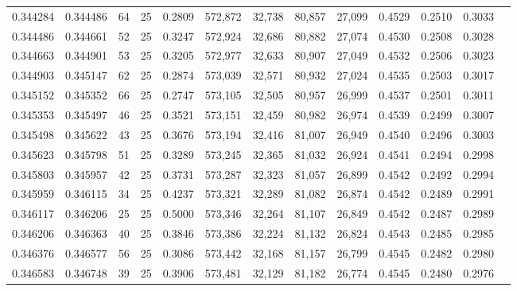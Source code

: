 \begin{tabular}{rrrrrrrrrrrrr}
0.344284 & 0.344486 &    64 &  25 &                                     0.2809 & 572,872 &  32,738 &  80,857 &  27,099 & 0.4529 & 0.2510 & 0.3033 \\
0.344486 & 0.344661 &    52 &  25 &                                     0.3247 & 572,924 &  32,686 &  80,882 &  27,074 & 0.4530 & 0.2508 & 0.3028 \\
0.344663 & 0.344901 &    53 &  25 &                                     0.3205 & 572,977 &  32,633 &  80,907 &  27,049 & 0.4532 & 0.2506 & 0.3023 \\
0.344903 & 0.345147 &    62 &  25 &                                     0.2874 & 573,039 &  32,571 &  80,932 &  27,024 & 0.4535 & 0.2503 & 0.3017 \\
0.345152 & 0.345352 &    66 &  25 &                                     0.2747 & 573,105 &  32,505 &  80,957 &  26,999 & 0.4537 & 0.2501 & 0.3011 \\
0.345353 & 0.345497 &    46 &  25 &                                     0.3521 & 573,151 &  32,459 &  80,982 &  26,974 & 0.4539 & 0.2499 & 0.3007 \\
0.345498 & 0.345622 &    43 &  25 &                                     0.3676 & 573,194 &  32,416 &  81,007 &  26,949 & 0.4540 & 0.2496 & 0.3003 \\
0.345623 & 0.345798 &    51 &  25 &                                     0.3289 & 573,245 &  32,365 &  81,032 &  26,924 & 0.4541 & 0.2494 & 0.2998 \\
0.345803 & 0.345957 &    42 &  25 &                                     0.3731 & 573,287 &  32,323 &  81,057 &  26,899 & 0.4542 & 0.2492 & 0.2994 \\
0.345959 & 0.346115 &    34 &  25 &                                     0.4237 & 573,321 &  32,289 &  81,082 &  26,874 & 0.4542 & 0.2489 & 0.2991 \\
0.346117 & 0.346206 &    25 &  25 &                                     0.5000 & 573,346 &  32,264 &  81,107 &  26,849 & 0.4542 & 0.2487 & 0.2989 \\
0.346206 & 0.346363 &    40 &  25 &                                     0.3846 & 573,386 &  32,224 &  81,132 &  26,824 & 0.4543 & 0.2485 & 0.2985 \\
0.346376 & 0.346577 &    56 &  25 &                                     0.3086 & 573,442 &  32,168 &  81,157 &  26,799 & 0.4545 & 0.2482 & 0.2980 \\
0.346583 & 0.346748 &    39 &  25 &                                     0.3906 & 573,481 &  32,129 &  81,182 &  26,774 & 0.4545 & 0.2480 & 0.2976 \\

\end{tabular}

